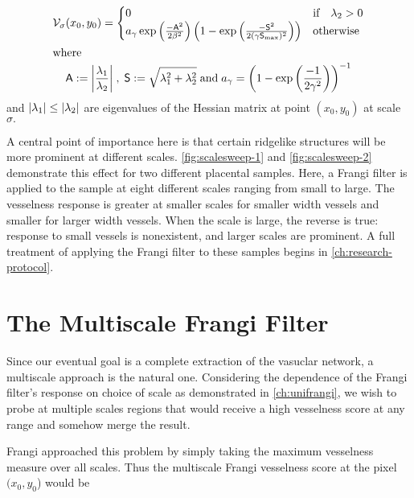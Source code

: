    \begin{gather} \label{eq:Vsigma}
    \Vsigma(x_0,y_0) = \begin{cases}
    0 & \text{if} \quad \lambda_2 > 0 \\
    a_\gamma \exp\left(\frac{-\Am^2}{2\beta^2}\right)
    \left(1 - \exp\left(\frac{-\Sm^2}{2(\gamma \Smax)^2}\right)\right) & \text{otherwise}
    \end{cases} \\
    \shortintertext{where}
    \Am := \abs*{\frac{\lambda_1}{\lambda_2}}
    \;,\;
    \Sm := \sqrt{\lambda_1^2 + \lambda_2^2}
    \;\textrm{and}\;
    a_\gamma = \left(1-\exp\left(\frac{-1}{2\gamma^2}\right)\right)^{-1} \notag\\
    \end{gather}
    and $\abs*{\lambda_1} \le \abs*{\lambda_2}$
    are eigenvalues of the Hessian matrix at point $(x_0, y_0)$ at scale $\sigma.$

    A central point of importance here is that certain ridgelike structures will be more prominent at different scales. \cref{fig:scalesweep-1} and \cref{fig:scalesweep-2} demonstrate this effect for two different placental samples. Here, a Frangi filter is applied to the sample at eight different scales ranging from small to large. The vesselness response is greater at smaller scales for smaller width vessels and smaller for larger width vessels. When the scale is large, the reverse is true: response to small vessels is nonexistent, and larger scales are prominent.  A full treatment of applying the Frangi filter to these samples begins in \cref{ch:research-protocol}.
    
    \section{The Multiscale Frangi Filter}
    Since our eventual goal is a complete extraction of the vasuclar network, a multiscale approach is the natural one. Considering the dependence of the Frangi filter's response on choice of scale as demonstrated in \cref{ch:unifrangi}, we wish to probe at multiple scales
   regions that would receive a high vesselness score at any range and somehow merge the result.
   
    Frangi \autocite{frangi-paper} approached this problem by simply taking the maximum vesselness measure over all scales. Thus the multiscale Frangi vesselness score at the pixel $(x_0, y_0$) would be 
    
